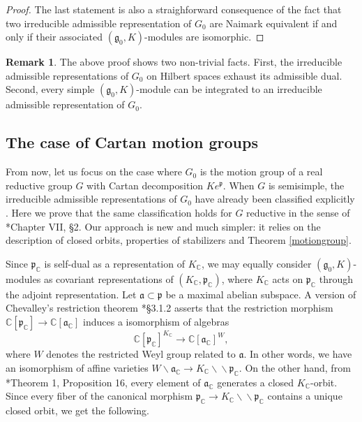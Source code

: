 \documentclass{amsart}
\theoremstyle{definition}
\newtheorem{remark}[theorem]{Remark}
\newcommand{\dquo}{\backslash \!\! \backslash}
\begin{document}
\begin{proof}
    The last statement is also a straighforward consequence of the fact that two irreducible admissible representation of $G_0$ are Naimark equivalent if and only if their associated $(\mathfrak{g}_0,K)$-modules are isomorphic.
\end{proof}

\begin{remark}
    The above proof shows two non-trivial facts. First, the irreducible admissible representations of $G_0$ on Hilbert spaces exhaust its admissible dual. Second, every simple $(\mathfrak{g}_0,K)$-module can be integrated to an irreducible admissible representation of $G_0$.
\end{remark}

\subsection{The case of Cartan motion groups}
From now, let us focus on the case where $G_0$ is the motion group of a real reductive group $G$ with Cartan decomposition $Ke^{\mathfrak{p}}$. When $G$ is semisimple, the irreducible admissible representations of $G_0$ have already been classified explicitly \cites{DelormeCh, Rader}. Here we prove that the same classification holds for $G$ reductive in the sense of \cite{Knapp}*{Chapter {\rm VII}, §2}. Our approach is new and much simpler: it relies on the description of closed orbits, properties of stabilizers and Theorem \ref{motiongroup}.


Since $\mathfrak{p}_\mathbb{C}$ is self-dual as a representation of $K_\mathbb{C}$, we may equally consider $(\mathfrak{g}_0,K)$-modules as covariant representations of $(K_\mathbb{C}, \mathfrak{p}_\mathbb{C})$, where $K_\mathbb{C}$ acts on $\mathfrak{p}_\mathbb{C}$ through the adjoint representation. Let $\mathfrak{a} \subset \mathfrak{p}$ be a maximal abelian subspace. A version of Chevalley's restriction theorem \cite{Wallach}*{§3.1.2} asserts that the restriction morphism $\mathbb{C}[\mathfrak{p}_\mathbb{C}] \to \mathbb{C}[\mathfrak{a}_\mathbb{C}]$ induces a isomorphism of algebras
$$\mathbb{C}[\mathfrak{p}_\mathbb{C}]^{K_\mathbb{C}} \longrightarrow \mathbb{C}[\mathfrak{a}_\mathbb{C}]^W,$$
where $W$ denotes the restricted Weyl group related to $\mathfrak{a}$.
In other words, we have an isomorphism of affine varieties $W \backslash \mathfrak{a}_\mathbb{C} \to K_\mathbb{C} \dquo \mathfrak{p}_\mathbb{C}$. On the other hand, from \cite{KostantRallis}*{Theorem 1, Proposition 16}, every element of $\mathfrak{a}_\mathbb{C}$ generates a closed $K_\mathbb{C}$-orbit. Since every fiber of the canonical morphism $\mathfrak{p}_\mathbb{C} \to K_\mathbb{C} \dquo \mathfrak{p}_\mathbb{C}$ contains a unique closed orbit, we get the following.
\end{document}
